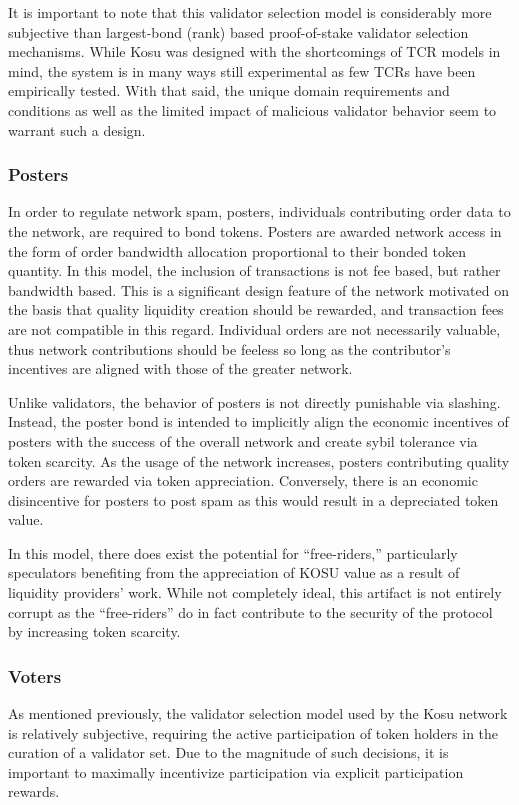 \documentclass[10pt]{article}
\begin{document}
It is important to note that this validator selection model is considerably more subjective than largest-bond (rank) based proof-of-stake validator selection mechanisms. While Kosu was designed with the shortcomings of TCR models in mind, the system is in many ways still experimental as few TCRs have been empirically tested. With that said, the unique domain requirements and conditions as well as the limited impact of malicious validator behavior seem to warrant such a design.

\subsubsection{Posters}\label{incentive-models-posters}
In order to regulate network spam, posters, individuals contributing order data to the network, are required to bond tokens. Posters are awarded network access in the form of order bandwidth allocation proportional to their bonded token quantity. In this model, the inclusion of transactions is not fee based, but rather bandwidth based. This is a significant design feature of the network motivated on the basis that quality liquidity creation should be rewarded, and transaction fees are not compatible in this regard. Individual orders are not necessarily valuable, thus network contributions should be feeless so long as the contributor’s incentives are aligned with those of the greater network.
\medskip

Unlike validators, the behavior of posters is not directly punishable via slashing. Instead, the poster bond is intended to implicitly align the economic incentives of posters with the success of the overall network and create sybil tolerance via token scarcity. As the usage of the network increases, posters contributing quality orders are rewarded via token appreciation. Conversely, there is an economic disincentive for posters to post spam as this would result in a depreciated token value.
\medskip

In this model, there does exist the potential for ``free-riders,'' particularly speculators benefiting from the appreciation of KOSU value as a result of liquidity providers’ work. While not completely ideal, this artifact is not entirely corrupt as the ``free-riders'' do in fact contribute to the security of the protocol by increasing token scarcity. 

\subsubsection{Voters}\label{incentive-models-voters}
As mentioned previously, the validator selection model used by the Kosu network is relatively subjective, requiring the active participation of token holders in the curation of a validator set. Due to the magnitude of such decisions, it is important to maximally incentivize participation via explicit participation rewards. 
\medskip
\end{document}
